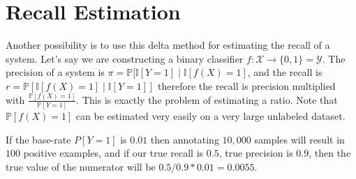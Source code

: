 \documentclass[preview,border={30 30 30 30}]{standalone}
\begin{document}
\section{Recall Estimation}
Another possibility is to use this delta method for estimating the recall of a system. Let's say we are constructing a binary classifier $f: \mathcal{X} \rightarrow \{0, 1\} = \mathcal{Y}.$
The precision of a system is $\pi = \mathbb{P}[\mathbb{I}[Y=1] \mid \mathbb{I}{[f(X) = 1]}$, and the recall is $r = \mathbb{P}[\mathbb{I}{[f(X) = 1]} \mid \mathbb{I}[Y=1]]$ therefore the recall is precision multiplied with $\frac{\mathbb{P}[f(X) = 1]}{\mathbb{P}[Y = 1]}$. This is exactly the problem of estimating a ratio. Note that $\mathbb{P}[f(X) = 1]$ can be estimated very easily on a very large unlabeled dataset.

If the base-rate $P[Y=1]$ is $0.01$ then annotating $10,000$ samples will result in $100$ positive examples, and if our true recall is $0.5$, true precision is $0.9$, then the true value of the numerator will be $0.5/0.9 * 0.01 = 0.0055$.
\end{document}
